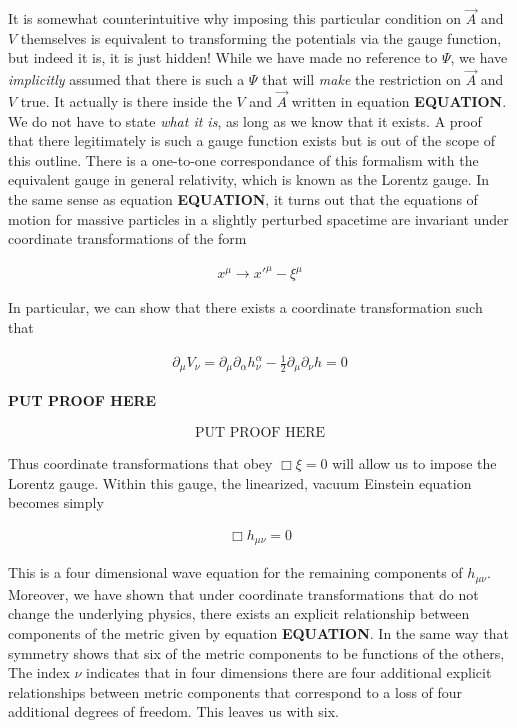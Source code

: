 \documentclass[paper=a4, fontsize=11pt]{scrartcl} %
\numberwithin{equation}{section} %
\numberwithin{figure}{section} %
\numberwithin{table}{section} %
\begin{document}
It is somewhat counterintuitive why imposing this particular condition on $\vec{A}$ and $V$ themselves is equivalent to transforming the potentials via the gauge function, but indeed it is, it is just hidden! While we have made no reference to $\Psi$, we have \textit{implicitly} assumed that there is such a $\Psi$ that will \textit{make} the restriction on $\vec{A}$ and $V$ true. It actually is there inside the $V$ and $\vec{A}$ written in equation \textbf{EQUATION}. We do not have to state \textit{what it is}, as long as we know that it exists. A proof that there legitimately is such a gauge function exists but is out of the scope of this outline. 
There is a one-to-one correspondance of this formalism with the equivalent gauge in general relativity, which is known as the Lorentz gauge. In the same sense as equation \textbf{EQUATION}, it turns out that the equations of motion for massive particles in a slightly perturbed spacetime are invariant under coordinate transformations of the form  

\begin{align}
x^{\mu} \rightarrow x'^{\mu} - \xi^{\mu}
\end{align}

In particular, we can show that there exists a coordinate transformation such that 

\begin{align}
\partial_{\mu}V_{\nu} = \partial_{\mu}\partial_{\alpha}h^{\alpha}_{\nu} - \frac{1}{2}\partial_{\mu}\partial_{\nu}h = 0
\end{align} 

\textbf{PUT PROOF HERE}

\begin{align}
\text{PUT PROOF HERE}
\end{align}

Thus coordinate transformations that obey $\Box \xi = 0$ will allow us to impose the Lorentz gauge. Within this gauge, the linearized, vacuum Einstein equation becomes simply

\begin{align}
\Box h_{\mu \nu} = 0
\end{align}

This is a four dimensional wave equation for the remaining components of $h_{\mu \nu}$. Moreover, we have shown that under coordinate transformations that do not change the underlying physics, there exists an explicit relationship between components of the metric given by equation \textbf{EQUATION}. In the same way that symmetry shows that six of the metric components to be functions of the others, The index $\nu$ indicates that in four dimensions there are four additional explicit relationships between metric components that correspond to a loss of four additional degrees of freedom. This leaves us with six.  
\end{document}
